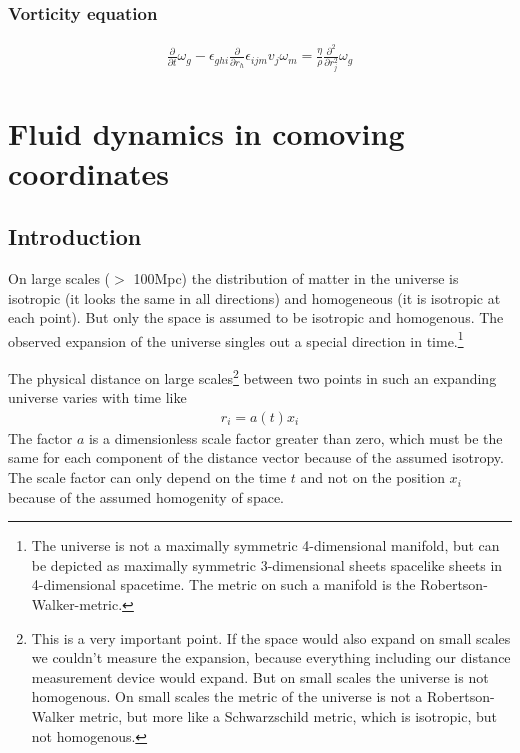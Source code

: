 \documentclass[a4paper,
					12pt,
					twoside,
					openright
					]{book}
\newcommand{\pd}[1]{\frac{\partial}{\partial #1}}
\newcommand{\pdd}[1]{\frac{\partial^2}{\partial #1^2}}
\begin{document}
\subsection*{Vorticity equation}
\begin{align}
\pd{t}\omega_g
-\epsilon_{ghi}\pd{r_h} \epsilon_{ijm} v_j \omega_m =
\frac{\eta}{\rho}\pdd{r_j}\omega_g
\end{align}

\chapter{Fluid dynamics in comoving coordinates}
\section{Introduction}
On large scales ($>$ 100Mpc) the distribution of matter 
in the universe is isotropic (it looks the same in all directions) 
and homogeneous (it is isotropic at each point). But only the space 
is assumed to be isotropic and homogenous. The observed expansion of 
the universe singles out a special direction in time.\footnote{The 
universe is not a maximally symmetric 4-dimensional manifold, but can be 
depicted as maximally symmetric 3-dimensional sheets spacelike sheets 
in 4-dimensional spacetime. The metric on such a manifold is the 
Robertson-Walker-metric.}

The physical distance on large scales\footnote{This is a very important 
point. If the space would also
expand on small scales we couldn't measure the expansion, because everything 
including our distance measurement device would expand. But on small scales
the universe is not homogenous. On small scales the metric of the universe is 
not a Robertson-Walker metric, but more like a Schwarzschild metric, which
is isotropic, but not homogenous.} 
between two points in such an expanding universe varies with time like
\begin{align}
r_i=a(t) x_i
\end{align}
The factor $a$ is a dimensionless scale factor greater than zero, which must 
be the same for each component of the distance vector because of the assumed isotropy.
The scale factor can only depend on the time $t$ and not on the position
$x_i$ because of the assumed homogenity of space. 
\end{document}
